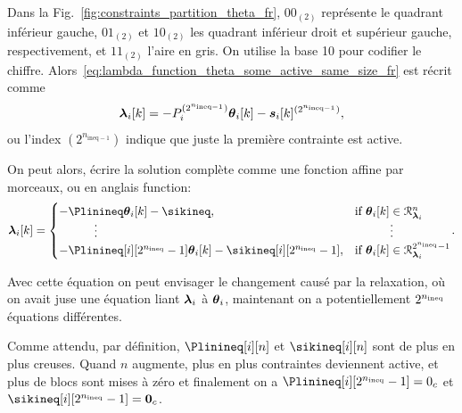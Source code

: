 \documentclass[../main.tex]{subfiles}
\begin{document}
Dans la Fig.~\ref{fig:constraints_partition_theta_fr}, ${00}_{(2)}$ représente le quadrant inférieur gauche, ${01}_{(2)}$ et ${10}_{(2)}$ les quadrant inférieur droit et supérieur gauche, respectivement, et ${11}_{(2)}$ l'aire en gris.
On utilise la base 10 pour codifier le chiffre.
Alors~\eqref{eq:lambda_function_theta_some_active_same_size_fr} est récrit comme
\begin{equation}
  \label{eq:lambda_function_theta_same_size_coded}
  \lambdaik=-\Plin^{(2^{n_{\text{ineq}-1}})}\thetaik-\sik^{(2^{n_{\text{ineq}-1}})},
\end{equation}
ou l'index $(2^{n_{\text{ineq}-1}})$ indique que juste la première contrainte est active.

On peut alors, écrire la solution complète comme une fonction affine par morceaux, ou en anglais
\pwa{} function:
\begin{equation}
  \label{eq:lambdafuntheta_fr}
  \begin{aligned}
    \lambdaik=
    \begin{cases}
      -\Plinineq\thetaik-\sikineq,&\text{if}\ \thetaik \in\set{R}_{\lambdai}^{n}\\
      \qquad\quad \vdots&\qquad\quad \vdots\\
      -\Plinineq[i][2^{\nineq}-1]\thetaik-\sikineq[i][2^{\nineq}-1],&\text{if}\ \thetaik \in\set{R}_{\lambdai}^{2^{\nineq}-1}\\
    \end{cases}
  \end{aligned}.
\end{equation}

Avec cette équation on peut envisager le changement causé par la relaxation, où on avait juse une équation liant $\boldsymbol{\lambda}_{i}$ à $\boldsymbol{\theta}_{i}$, maintenant on a potentiellement $2^{n_{\text{ineq}}}$ équations différentes.

\begin{remark}\label{rem:sparse_solutions_fr}
  Comme attendu, par définition, $\Plinineq[i][n]$ et $\sikineq[i][n]$ sont de plus en plus creuses.
  Quand $n$ augmente, plus en plus contraintes deviennent active, et plus de blocs sont mises à zéro et finalement on a $\Plinineq[i][2^{\nineq}-1]=0_{c}$ et $\sikineq[i][2^{\nineq}-1]=\0_{c}$.
\end{remark}
\end{document}
